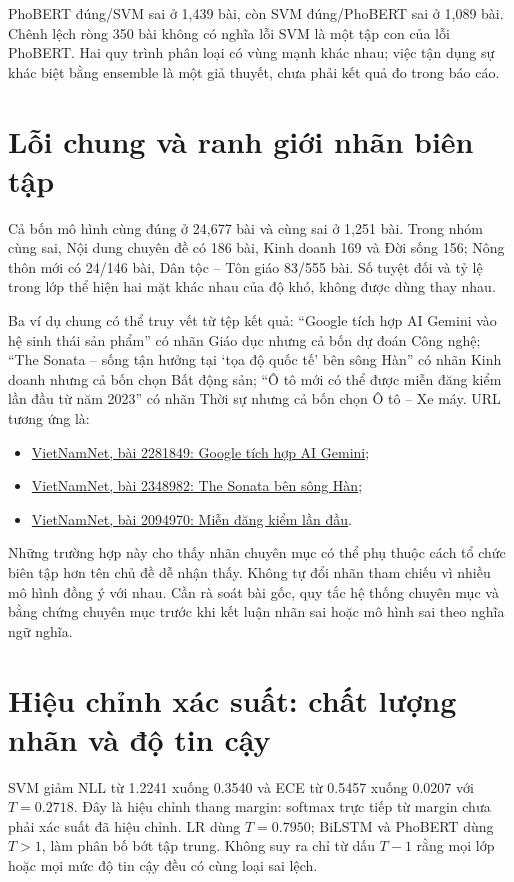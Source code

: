 PhoBERT đúng/SVM sai ở 1,439 bài, còn SVM đúng/PhoBERT sai ở 1,089 bài. Chênh lệch ròng 350 bài không có nghĩa lỗi SVM là một tập con của lỗi PhoBERT. Hai quy trình phân loại có vùng mạnh khác nhau; việc tận dụng sự khác biệt bằng ensemble là một giả thuyết, chưa phải kết quả đo trong báo cáo.

\section{Lỗi chung và ranh giới nhãn biên tập}
Cả bốn mô hình cùng đúng ở 24,677 bài và cùng sai ở 1,251 bài. Trong nhóm cùng sai, Nội dung chuyên đề có 186 bài, Kinh doanh 169 và Đời sống 156; Nông thôn mới có 24/146 bài, Dân tộc -- Tôn giáo 83/555 bài. Số tuyệt đối và tỷ lệ trong lớp thể hiện hai mặt khác nhau của độ khó, không được dùng thay nhau.

Ba ví dụ chung có thể truy vết từ tệp kết quả: ``Google tích hợp AI Gemini vào hệ sinh thái sản phẩm'' có nhãn Giáo dục nhưng cả bốn dự đoán Công nghệ; ``The Sonata -- sống tận hưởng tại `tọa độ quốc tế' bên sông Hàn'' có nhãn Kinh doanh nhưng cả bốn chọn Bất động sản; ``Ô tô mới có thể được miễn đăng kiểm lần đầu từ năm 2023'' có nhãn Thời sự nhưng cả bốn chọn Ô tô -- Xe máy. URL tương ứng là:
\begin{itemize}
\item \href{https://vietnamnet.vn/google-tich-hop-ai-gemini-vao-he-sinh-thai-san-pham-2281849.html}{VietNamNet, bài 2281849: Google tích hợp AI Gemini};
\item \href{https://vietnamnet.vn/the-sonata-song-tan-huong-tai-toa-do-quoc-te-ben-song-han-2348982.html}{VietNamNet, bài 2348982: The Sonata bên sông Hàn};
\item \href{https://vietnamnet.vn/o-to-moi-co-the-duoc-mien-dang-kiem-lan-dau-tu-nam-2023-2094970.html}{VietNamNet, bài 2094970: Miễn đăng kiểm lần đầu}.
\end{itemize}
Những trường hợp này cho thấy nhãn chuyên mục có thể phụ thuộc cách tổ chức biên tập hơn tên chủ đề dễ nhận thấy. Không tự đổi nhãn tham chiếu vì nhiều mô hình đồng ý với nhau. Cần rà soát bài gốc, quy tắc hệ thống chuyên mục và bằng chứng chuyên mục trước khi kết luận nhãn sai hoặc mô hình sai theo nghĩa ngữ nghĩa.

\section{Hiệu chỉnh xác suất: chất lượng nhãn và độ tin cậy}
SVM giảm NLL từ 1.2241 xuống 0.3540 và ECE từ 0.5457 xuống 0.0207 với $T=0.2718$. Đây là hiệu chỉnh thang margin: softmax trực tiếp từ margin chưa phải xác suất đã hiệu chỉnh. LR dùng $T=0.7950$; BiLSTM và PhoBERT dùng $T>1$, làm phân bố bớt tập trung. Không suy ra chỉ từ dấu $T-1$ rằng mọi lớp hoặc mọi mức độ tin cậy đều có cùng loại sai lệch.

